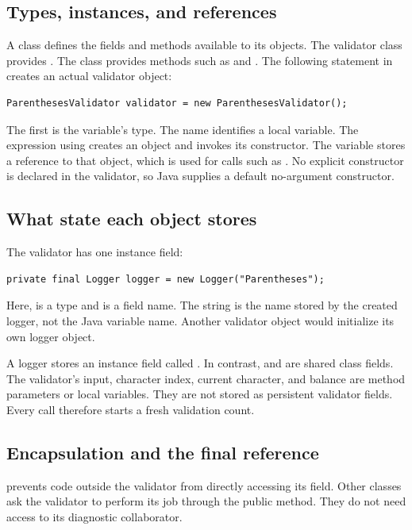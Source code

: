 \subsection{Types, instances, and references}
A class defines the fields and methods available to its objects. The validator class provides . The  class provides methods such as  and . The following statement in  creates an actual validator object:
\begin{lstlisting}
ParenthesesValidator validator = new ParenthesesValidator();
\end{lstlisting}
The first  is the variable's type. The name  identifies a local variable. The expression using  creates an object and invokes its constructor. The variable stores a reference to that object, which is used for calls such as . No explicit constructor is declared in the validator, so Java supplies a default no-argument constructor.

\subsection{What state each object stores}
The validator has one instance field:
\begin{lstlisting}
private final Logger logger = new Logger("Parentheses");
\end{lstlisting}
Here,  is a type and  is a field name. The string  is the name stored by the created logger, not the Java variable name. Another validator object would initialize its own logger object.

A logger stores an instance field called . In contrast,  and  are shared class fields. The validator's input, character index, current character, and balance are method parameters or local variables. They are not stored as persistent validator fields. Every call therefore starts a fresh validation count.

\subsection{Encapsulation and the final reference}
 prevents code outside the validator from directly accessing its  field. Other classes ask the validator to perform its job through the public  method. They do not need access to its diagnostic collaborator.

